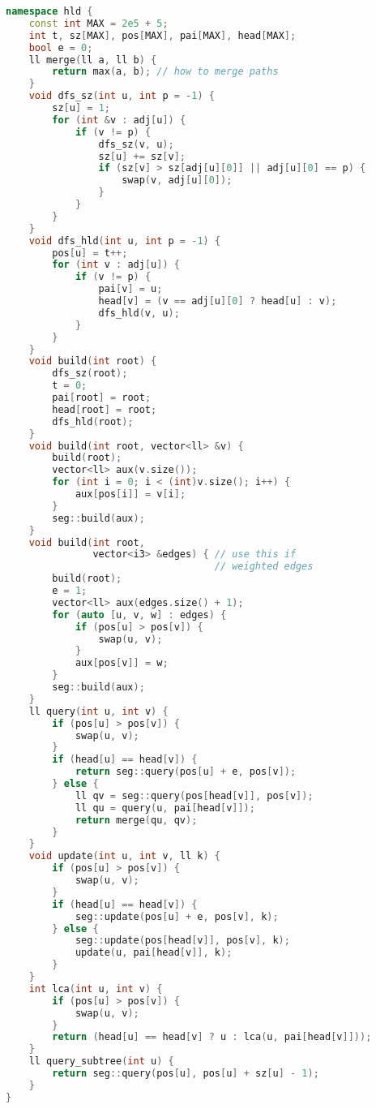 \documentclass[11pt, a4paper, oneside]{book}
\begin{document}
\hfill

\begin{multicols}{2}
\begin{lstlisting}[language=C++]
namespace hld {
    const int MAX = 2e5 + 5;
    int t, sz[MAX], pos[MAX], pai[MAX], head[MAX];
    bool e = 0;
    ll merge(ll a, ll b) {
        return max(a, b); // how to merge paths
    }
    void dfs_sz(int u, int p = -1) {
        sz[u] = 1;
        for (int &v : adj[u]) {
            if (v != p) {
                dfs_sz(v, u);
                sz[u] += sz[v];
                if (sz[v] > sz[adj[u][0]] || adj[u][0] == p) {
                    swap(v, adj[u][0]);
                }
            }
        }
    }
    void dfs_hld(int u, int p = -1) {
        pos[u] = t++;
        for (int v : adj[u]) {
            if (v != p) {
                pai[v] = u;
                head[v] = (v == adj[u][0] ? head[u] : v);
                dfs_hld(v, u);
            }
        }
    }
    void build(int root) {
        dfs_sz(root);
        t = 0;
        pai[root] = root;
        head[root] = root;
        dfs_hld(root);
    }
    void build(int root, vector<ll> &v) {
        build(root);
        vector<ll> aux(v.size());
        for (int i = 0; i < (int)v.size(); i++) {
            aux[pos[i]] = v[i];
        }
        seg::build(aux);
    }
    void build(int root,
               vector<i3> &edges) { // use this if
                                    // weighted edges
        build(root);
        e = 1;
        vector<ll> aux(edges.size() + 1);
        for (auto [u, v, w] : edges) {
            if (pos[u] > pos[v]) {
                swap(u, v);
            }
            aux[pos[v]] = w;
        }
        seg::build(aux);
    }
    ll query(int u, int v) {
        if (pos[u] > pos[v]) {
            swap(u, v);
        }
        if (head[u] == head[v]) {
            return seg::query(pos[u] + e, pos[v]);
        } else {
            ll qv = seg::query(pos[head[v]], pos[v]);
            ll qu = query(u, pai[head[v]]);
            return merge(qu, qv);
        }
    }
    void update(int u, int v, ll k) {
        if (pos[u] > pos[v]) {
            swap(u, v);
        }
        if (head[u] == head[v]) {
            seg::update(pos[u] + e, pos[v], k);
        } else {
            seg::update(pos[head[v]], pos[v], k);
            update(u, pai[head[v]], k);
        }
    }
    int lca(int u, int v) {
        if (pos[u] > pos[v]) {
            swap(u, v);
        }
        return (head[u] == head[v] ? u : lca(u, pai[head[v]]));
    }
    ll query_subtree(int u) {
        return seg::query(pos[u], pos[u] + sz[u] - 1);
    }
}
\end{lstlisting}
\end{multicols}
\end{document}
